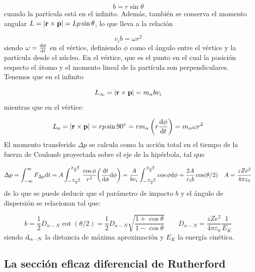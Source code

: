 \begin{equation}
    b = r \sin \theta
\end{equation}
cuando la partícula está en el infinito. Además, también se conserva el momento angular $L = |\mathbf{r} \times \mathbf{p}|=L p \sin \theta$, lo que lleva a la relación 

\begin{equation}
    v_i b = \omega r^2
\end{equation}
siendo $\omega=\dv{\phi}{t}$ en el vértice, definiendo $\phi$ como el ángulo entre el vértice y la partícula desde el núcleo. En el vértice, que es el punto en el cual la posición respecto el átomo y el momento lineal de la partícula son perpendiculares. Tenemos que en el infinito

\begin{equation}
    L_\infty = |\mathbf{r} \times \mathbf{p} | = m_\alpha b v_i        
\end{equation}
mientras que en el vértice: 

\begin{equation}
    L_a = |\mathbf{r} \times \mathbf{p} | = r p \sin 90^\circ = r m_\alpha \left( r \dv{\phi}{t} \right)  = m_\alpha \omega r^2
\end{equation}  
El momento transferido $\Delta p$ se calcula como la acción total en el tiempo de la fuerza de Coulomb proyectada sobre el eje de la hipérbola, tal que

\begin{equation}
    \Delta p = \int_{-\infty}^{\infty} F_{\Delta p} \D t  = A \int_{-\frac{\pi-\theta}{2}}^{\frac{\pi-\theta}{2}} \frac{\cos \phi}{r^2} \pqty{\dv{t}{\phi} \D \phi}  = \frac{A}{b v_i} \int_{-\frac{\pi-\theta}{2}}^{\frac{\pi-\theta}{2}} \cos \phi \D \phi = \frac{2 A}{v_i b} \cos (\theta/2) \quad A = \frac{zZe^2}{4\pi \varepsilon_0}
\end{equation}
de lo que se puede deducir que el parámetro de impacto $b$ y el ángulo de dispersión se relacionan tal que:

\begin{equation}
    b = \frac{1}{2} D_{\alpha - N} \cot (\theta/2) = \frac{1}{2} D_{\alpha-N} \sqrt{\frac{1+\cos \theta}{1-\cos \theta}} \qquad D_{\alpha-N} = \frac{zZe^2}{4\pi \varepsilon_0} \frac{1}{E_K}
\end{equation}
siendo $\mathrm{d}_{\alpha-N}$ la distancia de máxima aproximación y $E_K$ la energía cinética. 

\subsection{La sección eficaz diferencial de Rutherford}

